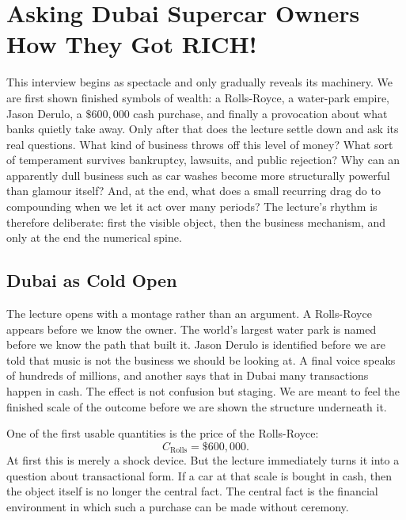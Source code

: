 \chapter{Asking Dubai Supercar Owners How They Got RICH!}

This interview begins as spectacle and only gradually reveals its machinery. We are first shown finished symbols of wealth: a Rolls-Royce, a water-park empire, Jason Derulo, a \(\$600{,}000\) cash purchase, and finally a provocation about what banks quietly take away. Only after that does the lecture settle down and ask its real questions. What kind of business throws off this level of money? What sort of temperament survives bankruptcy, lawsuits, and public rejection? Why can an apparently dull business such as car washes become more structurally powerful than glamour itself? And, at the end, what does a small recurring drag do to compounding when we let it act over many periods? The lecture's rhythm is therefore deliberate: first the visible object, then the business mechanism, and only at the end the numerical spine.

\section{Dubai as Cold Open}

The lecture opens with a montage rather than an argument. A Rolls-Royce appears before we know the owner. The world's largest water park is named before we know the path that built it. Jason Derulo is identified before we are told that music is not the business we should be looking at. A final voice speaks of hundreds of millions, and another says that in Dubai many transactions happen in cash. The effect is not confusion but staging. We are meant to feel the finished scale of the outcome before we are shown the structure underneath it.

One of the first usable quantities is the price of the Rolls-Royce:
\begin{equation}
C_{\text{Rolls}}=\$600{,}000.
\end{equation}
At first this is merely a shock device. But the lecture immediately turns it into a question about transactional form. If a car at that scale is bought in cash, then the object itself is no longer the central fact. The central fact is the financial environment in which such a purchase can be made without ceremony.

